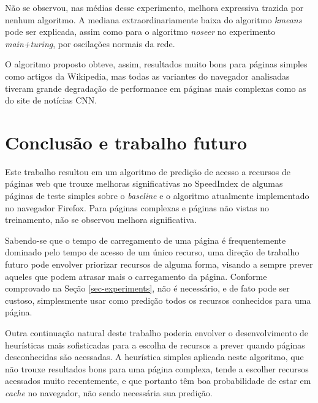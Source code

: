 \documentclass[10pt,twocolumn,letterpaper]{article}
\begin{document}
Não se observou, nas médias desse experimento, melhora expressiva trazida por nenhum algoritmo. A mediana extraordinariamente baixa do algoritmo \emph{kmeans} pode ser explicada, assim como para o algoritmo \emph{noseer} no experimento \emph{main+turing}, por oscilações normais da rede.

O algoritmo proposto obteve, assim, resultados muito bons para páginas simples como artigos da Wikipedia, mas todas as variantes do navegador analisadas tiveram grande degradação de performance em páginas mais complexas como as do site de notícias CNN.

\section{Conclusão e trabalho futuro}

Este trabalho resultou em um algoritmo de predição de acesso a recursos de páginas web que trouxe melhoras significativas no SpeedIndex de algumas páginas de teste simples sobre o \emph{baseline} e o algoritmo atualmente implementado no navegador Firefox. Para páginas complexas e páginas não vistas no treinamento, não se observou melhora significativa.

Sabendo-se que o tempo de carregamento de uma página é frequentemente dominado pelo tempo de acesso de um único recurso, uma direção de trabalho futuro pode envolver priorizar recursos de alguma forma, visando a sempre prever aqueles que podem atrasar mais o carregamento da página. Conforme comprovado na Seção \ref{sec-experiments}, não é necessário, e de fato pode ser custoso, simplesmente usar como predição todos os recursos conhecidos para uma página.

Outra continuação natural deste trabalho poderia envolver o desenvolvimento de heurísticas mais sofisticadas para a escolha de recursos a prever quando páginas desconhecidas são acessadas. A heurística simples aplicada neste algoritmo, que não trouxe resultados bons para uma página complexa, tende a escolher recursos acessados muito recentemente, e que portanto têm boa probabilidade de estar em \emph{cache} no navegador, não sendo necessária sua predição.

{\small


}
\end{document}

